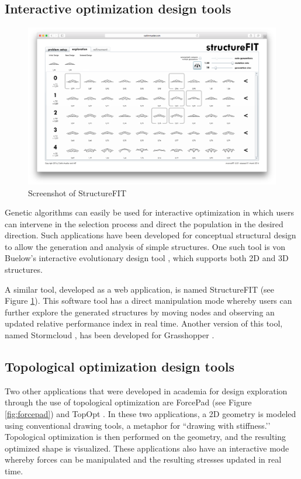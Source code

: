 \subsection{Interactive optimization design tools}

\begin{figure}
  \includegraphics[width=350pt]{graphics/structurefit.png}
  \caption{Screenshot of StructureFIT}
  \label{fig:structurefit}
\end{figure}

Genetic algorithms can easily be used for interactive optimization in which users can intervene in the selection process and direct the population in the desired direction. Such applications have been developed for conceptual structural design to allow the generation and analysis of simple structures. One such tool is von Buelow’s interactive evolutionary design tool \cite{VonBuelow2008}, which supports both 2D and 3D structures.

A similar tool, developed as a web application, is named StructureFIT \cite{Mueller2013, Mueller2015} (see Figure \ref{fig:structurefit}). This software tool has a direct manipulation mode whereby users can further explore the generated structures by moving nodes and observing an updated relative performance index in real time. Another version of this tool, named Stormcloud \cite{Danhaive2015}, has been developed for Grasshopper \cite{Grasshopper}.

\subsection{Topological optimization design tools}
Two other applications that were developed in academia for design exploration through the use of topological optimization are ForcePad \cite{Lindemann2004} (see Figure \ref{fig:forcepad}) and TopOpt \cite{Aage2013}. In these two applications, a 2D geometry is modeled using conventional drawing tools, a metaphor for ``drawing with stiffness.’’ Topological optimization is then performed on the geometry, and the resulting optimized shape is visualized. These applications also have an interactive mode whereby forces can be manipulated and the resulting stresses updated in real time.

